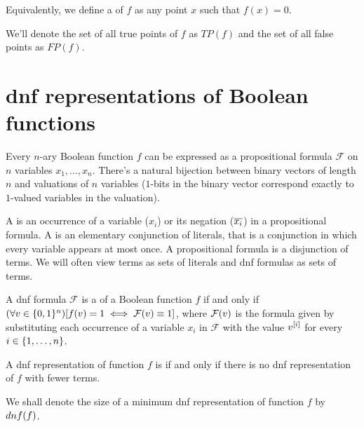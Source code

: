 Equivalently,
we define a  of $f$
as any point $x$
such that $f(x) = 0$.

We'll denote the set of all true points of $f$ as $TP(f)$
and the set of all false points as $FP(f)$.

\section{\texorpdfstring{\acrshort{dnf}}{DNF}
representations of Boolean functions}

Every $n$-ary Boolean function $f$ can be expressed
as a propositional formula $\mathcal{F}$ on $n$ variables
$x_1, \ldots, x_n$.
There's a natural bijection
between binary vectors of length $n$
and valuations of $n$ variables
($1$-bits in the binary vector
correspond exactly to $1$-valued variables
in the valuation).


\begin{definition}
A  is an occurrence
of a variable ($x_i$) or its negation ($\overline{x_i}$)
in a propositional formula.
A  is
an elementary conjunction of literals,
that is a conjunction in which every variable appears
at most once.
A  propositional formula
is a disjunction of terms.
We will often view terms as sets of literals
and \acrshort{dnf} formulas as sets of terms.
\end{definition}

A \acrshort{dnf} formula $\mathcal{F}$ is
a 
of a Boolean function $f$
if and only if
$(\forall v \in \{0, 1\}^n) [f(v) = 1 \iff
\mathcal{F} (v) \equiv 1]$,
where $\mathcal{F} (v)$ is the formula
given by substituting
each occurrence of a variable $x_i$ in $\mathcal{F}$
with the value $v^{[i]}$
for every $i \in \{1, \ldots, n\}$.

\begin{definition}
A \acrshort{dnf} representation of function $f$ is
if and only if
there is no \acrshort{dnf} representation of $f$
with fewer terms.

We shall denote the size of
a minimum \acrshort{dnf} representation
of function $f$
by $dnf (f)$.
\end{definition}

